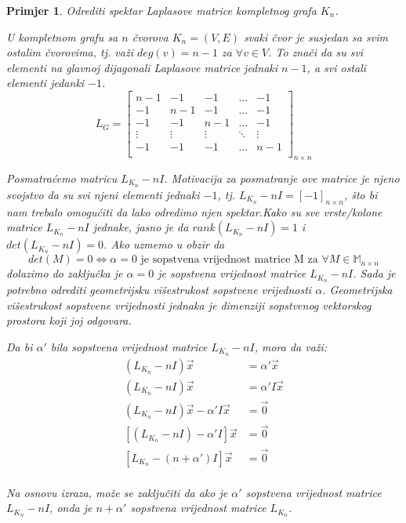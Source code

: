\documentclass[11pt]{article}
\newtheorem{example}{Primjer}
\begin{document}
	
	\begin{example}{Odrediti spektar Laplasove matrice kompletnog grafa $K_n$}.

	U kompletnom grafu sa $n$ čvorova $K_n =(V,E)$ svaki čvor je susjedan sa svim ostalim čvorovima, 
	tj. važi $deg(v)=n-1$ za $\forall v \in V$. To znači da su svi elementi na glavnoj dijagonali Laplasove matrice jednaki $n-1$,
	a svi ostali elementi jedanki $-1$.
	\[
	L_G =
	\begin{bmatrix}
	n-1 & -1 & -1 & \dots & -1 \\
	-1 & n-1 & -1 & \dots & -1 \\
	-1 & -1 & n-1 & \dots & -1 \\
	\vdots & \vdots & \vdots & \ddots & \vdots \\
	-1 & -1 & -1 & \dots & n-1 \\
	\end{bmatrix}_{n \times n}
	\]
	
	Posmatraćemo matricu $L_{K_n} - nI$. Motivacija za posmatranje ove matrice je njeno svojstvo da su svi njeni elementi jednaki $-1$, tj. $L_{K_n} - nI = [-1]_{n \times n}$,
	što bi nam trebalo omogućiti da lako odredimo njen spektar.Kako su sve vrste/kolone matrice $L_{K_n} - nI$ jednake, jasno je da $rank(L_{K_n} - nI) = 1$ i $det(L_{K_n} - nI) = 0$. 
	Ako uzmemo u obzir da 
	\[
	det(M) = 0 \Leftrightarrow \alpha = 0 \text{ je sopstvena vrijednost matrice M za } \forall M \in \mathbb{M}_{n \times n}
	\]
	dolazimo do zaključka je $\alpha = 0$ je sopstvena vrijednost matrice $L_{K_n} - nI$. 
	Sada je potrebno odrediti geometrijsku višestrukost sopstvene vrijednosti $\alpha$. Geometrijska višestrukost sopstvene vrijednosti jednaka je dimenziji sopstvenog vektorskog prostora koji joj odgovara.
	
	Da bi $\alpha'$ bila sopstvena vrijednost matrice $L_{K_n} - nI$, mora da važi:
	\[
	\begin{split}
	(L_{K_n} - nI)\vec{x} &= \alpha' \vec{x} \\
	(L_{K_n} - nI)\vec{x} &= \alpha' I \vec{x} \\
	(L_{K_n} - nI)\vec{x} - \alpha' I \vec{x} &= \vec{0}  \\
	[(L_{K_n} - nI) - \alpha' I] \vec{x} &= \vec{0}  \\
	[L_{K_n} - (n + \alpha') I] \vec{x} &= \vec{0}  \\
	\end{split}
	\]
	
	Na osnovu izraza, može se zaključiti da ako je $\alpha'$ sopstvena vrijednost matrice $L_{K_n} - nI$, onda je $n + \alpha'$ sopstvena vrijednost matrice $L_{K_n}$.


\end{example}
\end{document}
